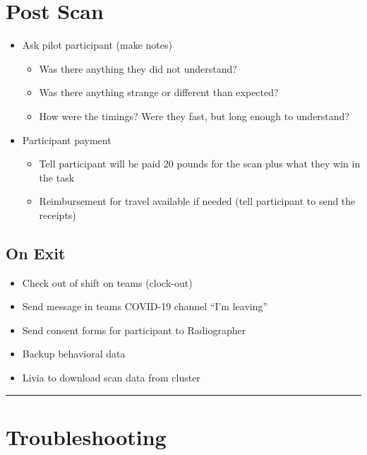 \documentclass[
]{book}
\providecommand{\tightlist}{%
  \setlength{\itemsep}{0pt}\setlength{\parskip}{0pt}}
\begin{document}
\hypertarget{post-scan}{%
\section{Post Scan}\label{post-scan}}

\begin{itemize}
\item
  Ask pilot participant (make notes)

  \begin{itemize}
  \tightlist
  \item
    Was there anything they did not understand?
  \item
    Was there anything strange or different than expected?
  \item
    How were the timings? Were they fast, but long enough to understand?
  \end{itemize}
\item
  Participant payment

  \begin{itemize}
  \tightlist
  \item
    Tell participant will be paid 20 pounds for the scan plus what they win in the task
  \item
    Reimbursement for travel available if needed (tell participant to send the receipts)
  \end{itemize}
\end{itemize}

\hypertarget{on-exit}{%
\subsection{On Exit}\label{on-exit}}

\begin{itemize}
\tightlist
\item
  Check out of shift on teams (clock-out)
\item
  Send message in teams COVID-19 channel ``I'm leaving''
\item
  Send consent forms for participant to Radiographer
\item
  Backup behavioral data
\item
  Livia to download scan data from cluster
\end{itemize}

\begin{center}\rule{0.5\linewidth}{0.5pt}\end{center}

\hypertarget{troubleshooting}{%
\section{Troubleshooting}\label{troubleshooting}}
\end{document}
